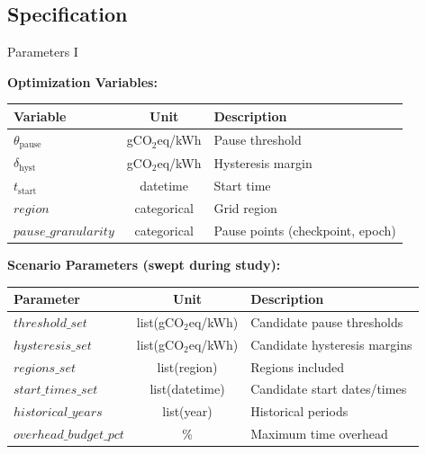 \subsection{Specification}

\begin{frame}[t]{Parameters I}{}

  \small

  \textbf{Optimization Variables:}
  \newline
  \begin{tabular}{l|c|l}
    \toprule
    Variable & Unit & Description \\
    \midrule
    $\theta_{\text{pause}}$ & gCO$_2$eq/kWh & Pause threshold \\
    $\delta_{\text{hyst}}$ & gCO$_2$eq/kWh & Hysteresis margin \\
    $t_{\text{start}}$ & datetime & Start time \\
    $\mathit{region}$ & categorical & Grid region \\
    $\mathit{pause\_granularity}$ & categorical & Pause points
    (checkpoint, epoch) \\
    \bottomrule
  \end{tabular}%

  \vspace{1cm}

  \textbf{Scenario Parameters (swept during study):}
  \newline
  \begin{tabular}{l|c|l}
    \toprule
    Parameter & Unit & Description \\
    \midrule
    $\mathit{threshold\_set}$ & list(gCO$_2$eq/kWh) & Candidate pause
    thresholds \\
    $\mathit{hysteresis\_set}$ & list(gCO$_2$eq/kWh) & Candidate
    hysteresis margins \\
    $\mathit{regions\_set}$ & list(region) & Regions included \\
    $\mathit{start\_times\_set}$ & list(datetime) & Candidate start
    dates/times \\
    $\mathit{historical\_years}$ & list(year) & Historical periods \\
    $\mathit{overhead\_budget\_pct}$ & \% & Maximum time overhead \\
    \bottomrule
  \end{tabular}%

\end{frame}
